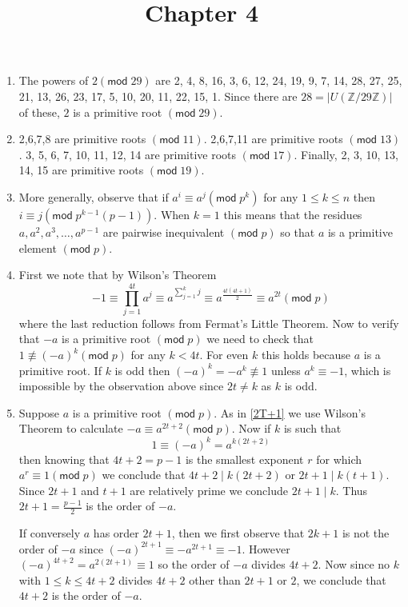 \documentclass[12pt]{article}
\title{Chapter 4}
\author{}\date{}
\renewcommand{\pmod}[1]{\left(\mathsf{mod}\;#1\right)}
\begin{document}
\maketitle
\thispagestyle{empty}

\begin{enumerate}
\item %
The powers of $2\pmod{29}$ are
2, 4, 8, 16, 3, 6, 12, 24, 19, 9,
7, 14, 28, 27, 25, 21, 13, 26, 23, 17, 5, 10, 20, 11, 22, 15, 1.
Since there are $28=\left|U\left(\mathbb{Z}/29\mathbb{Z}\right)\right|$
of these, $2$ is a primitive root $\pmod{29}$.

\item %
2,6,7,8 are primitive roots $\pmod{11}$.
2,6,7,11 are primitive roots $\pmod{13}$.
3, 5, 6, 7, 10, 11, 12, 14 are primitive roots $\pmod{17}$.
Finally, 2, 3, 10, 13, 14, 15 are primitive roots $\pmod{19}$.

\item %
More generally, observe that if $a^i\equiv a^j\pmod{p^k}$
for any $1\le k\le n$ then $i\equiv j\pmod{p^{k-1}\left(p-1\right)}$.
When $k=1$ this means that the residues
$a,a^2,a^3,\ldots,a^{p-1}$ are pairwise inequivalent
$\pmod{p}$ so that $a$ is a primitive element $\pmod{p}$.

\item\label{2T+1} %
First we note that by Wilson's Theorem
\[-1\equiv\prod_{j=1}^{4t}a^j
\equiv a^{\sum_{j=1}^kj}
\equiv a^{\frac{4t\left(4t+1\right)}{2}}
\equiv a^{2t}\pmod{p}\]
where the last reduction follows from Fermat's Little Theorem.
Now to verify that $-a$ is a primitive root $\pmod{p}$
we need to check that $1\not\equiv\left(-a\right)^k\pmod{p}$
for any $k<4t$. For even $k$ this holds because $a$ is a primitive root.
If $k$ is odd then
$\left(-a\right)^k=-a^k\not\equiv 1$ unless
$a^k\equiv -1$, which is impossible by the observation above
since $2t\ne k$ as $k$ is odd.

\item %
Suppose $a$ is a primitive root $\pmod{p}$. As in \autoref{2T+1}
we use Wilson's Theorem to calculate $-a\equiv a^{2t+2}\pmod{p}$.
Now if $k$ is such that
\[1\equiv\left(-a\right)^k=a^{k\left(2t+2\right)}\]
then knowing that $4t+2=p-1$ is the smallest exponent $r$ for
which $a^r\equiv 1\pmod{p}$ we conclude that
$4t+2\mid k\left(2t+2\right)$ or $2t+1\mid k\left(t+1\right)$.
Since $2t+1$ and $t+1$ are relatively prime we conclude $2t+1\mid k$.
Thus $2t+1=\frac{p-1}{2}$ is the order of $-a$.

If conversely $a$ has order $2t+1$, then we first observe that
$2k+1$ is not the order of $-a$ since $\left(-a\right)^{2t+1}
\equiv -a^{2t+1}\equiv -1$.
However $\left(-a\right)^{4t+2}=a^{2\left(2t+1\right)}\equiv 1$
so the order of $-a$ divides $4t+2$. Now since no
$k$ with $1\le k\le 4t+2$ divides $4t+2$ other than $2t+1$ or $2$,
we conclude that $4t+2$ is the order of $-a$.


\end{enumerate}
\end{document}
